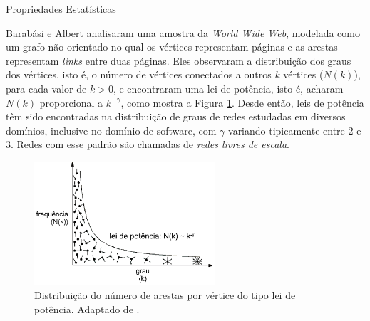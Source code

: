 \begin{section}{Propriedades Estatísticas}
	
Barabási e Albert \cite{Barabasi1999} analisaram uma amostra da \emph{World Wide Web}, modelada como um grafo não-orientado no qual os vértices representam páginas e as arestas representam \emph{links} entre duas páginas. Eles observaram a distribuição dos graus dos vértices, isto é, o número de vértices conectados a outros $k$ vértices ($N(k)$), para cada valor de $k > 0$, e encontraram uma lei de potência, isto é, acharam $N(k)$ proporcional a $k^{-\gamma}$, como mostra a Figura \ref{fig:leidepotencia}. Desde então, leis de potência têm sido encontradas na distribuição de graus de redes estudadas em diversos domínios, inclusive no domínio de software, com $\gamma$ variando tipicamente entre 2 e 3. Redes com esse padrão são chamadas de \emph{redes livres de escala}.



\begin{figure}[htbp]
	\centering
	\includegraphics[width=0.6\textwidth]{figuras/leidepotencia}
	\caption{Distribuição do número de arestas por vértice do tipo lei de potência. Adaptado de \cite{Barabasi2007}.}
	\label{fig:leidepotencia}
\end{figure}



\end{section}
